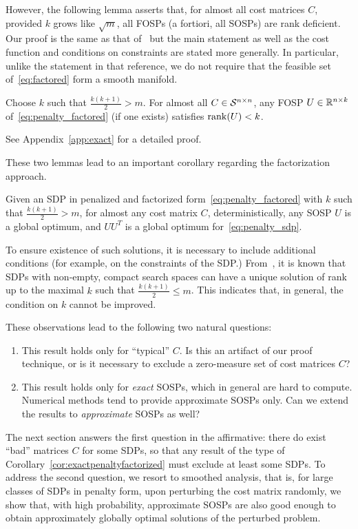 However, the following lemma asserts that, for almost all cost matrices $C$, provided $k$ grows like $\sqrt{m}$, all FOSPs (a fortiori, all SOSPs) are rank deficient. Our proof is the same as that of~\citep[Lemma 9]{boumal2016non} but the main statement as well as the cost function and conditions on constraints are stated more generally. In particular, unlike the statement in that reference, we do not require that the feasible set of~\eqref{eq:factored} form a smooth manifold. %
\begin{lemma}\label{lem:rank_deficient}
	Choose $k$ such that $\frac{k(k+1)}{2} > m$. For almost all $C \in \mathcal{S}^{n\times n}$, any FOSP $U \in \mathbb{R}^{n\times k}$ of~\eqref{eq:penalty_factored} (if one exists) satisfies $\operatorname{rank}(U) < k$.
\end{lemma}
See Appendix~\ref{app:exact} for a detailed proof. 

These two lemmas lead to an important corollary regarding the factorization approach.
\begin{corollary} \label{cor:exactpenaltyfactorized}
	Given an SDP in penalized and factorized form~\eqref{eq:penalty_factored} with $k$ such that $\frac{k(k+1)}{2} > m$, for almost any cost matrix $C$, deterministically, any SOSP $U$ is a global optimum, and $UU^T$ is a global optimum for~\eqref{eq:penalty_sdp}.
\end{corollary}
To ensure existence of such solutions, it is necessary to include additional conditions (for example, on the constraints of the SDP.) From~\citep{pataki1998rank,barvinok1995problems}, it is known that SDPs with non-empty, compact search spaces can have a unique solution of rank up to the maximal $k$ such that $\frac{k(k+1)}{2} \leq m$. This indicates that, in general, the condition on $k$ cannot be improved. 

These observations lead to the following two natural questions: 
\begin{enumerate}
	\item This result holds only for ``typical'' $C$. Is this an artifact of our proof technique, or is it necessary to exclude a zero-measure set of cost matrices $C$?
	\item This result holds only for \emph{exact} SOSPs, which in general are hard to compute. Numerical methods tend to provide approximate SOSPs only. Can we extend the results to \emph{approximate} SOSPs as well?
\end{enumerate}
The next section answers the first question in the affirmative: there do exist ``bad'' matrices $C$ for some SDPs, so that any result of the type of Corollary~\ref{cor:exactpenaltyfactorized} must exclude at least some SDPs. To address the second question, we resort to smoothed analysis, that is, for large classes of SDPs in penalty form, upon perturbing the cost matrix randomly, we show that, with high probability, approximate SOSPs are also good enough to obtain approximately globally optimal solutions of the perturbed problem. 
